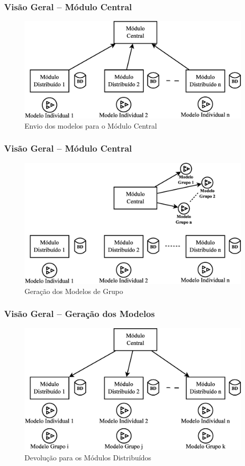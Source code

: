 \documentclass[hyperref={pdfpagelabels=false}]{beamer}
\begin{document}
\begin{frame}
	\frametitle{Visão Geral -- Módulo Central}
    \begin{figure}
		\centering
	    \includegraphics[scale=0.30]{img/VisaoGeral-02}
  		\caption{\scriptsize{Envio dos modelos para o Módulo Central}}
   	\end{figure}
\end{frame}

\begin{frame}
	\frametitle{Visão Geral -- Módulo Central}
    \begin{figure}
		\centering
	    \includegraphics[scale=0.30]{img/VisaoGeral-03}
  		\caption{\scriptsize{Geração dos Modelos de Grupo}}
   	\end{figure}
\end{frame}

\begin{frame}
	\frametitle{Visão Geral -- Geração dos Modelos}
    \begin{figure}
		\centering
	    \includegraphics[scale=0.30]{img/VisaoGeral-04}
  		\caption{\scriptsize{Devolução para os Módulos Distribuídos}}
   	\end{figure}
\end{frame}
\end{document}
